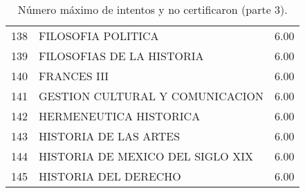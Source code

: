 \documentclass[12pt]{article}
\begin{document}
\begin{table}[ht]
{\begin{tabular}{rlr}
  138 & FILOSOFIA POLITICA & 6.00 \\ 
  139 & FILOSOFIAS DE LA HISTORIA & 6.00 \\ 
  140 & FRANCES III & 6.00 \\ 
  141 & GESTION CULTURAL Y COMUNICACION & 6.00 \\ 
  142 & HERMENEUTICA HISTORICA & 6.00 \\ 
  143 & HISTORIA DE LAS ARTES & 6.00 \\ 
  144 & HISTORIA DE MEXICO DEL SIGLO XIX & 6.00 \\ 
  145 & HISTORIA DEL DERECHO & 6.00 \\ 
   \hline
\end{tabular}
}\caption{\label{Num_Max_Intentos_Nunca_Cert_3} N\'umero m\'aximo de intentos y no certificaron (parte 3).}

\end{table}
\end{document}

